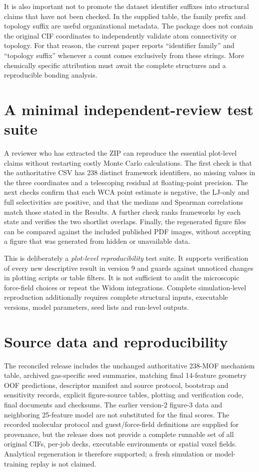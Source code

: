 \documentclass[11pt,a4paper]{article}
\begin{document}
It is also important not to promote the dataset identifier suffixes into structural claims that have not been checked. In the supplied table, the family prefix and topology suffix are useful organizational metadata. The package does not contain the original CIF coordinates to independently validate atom connectivity or topology. For that reason, the current paper reports ``identifier family'' and ``topology suffix'' whenever a count comes exclusively from these strings. More chemically specific attribution must await the complete structures and a reproducible bonding analysis.

\section{A minimal independent-review test suite}

A reviewer who has extracted the ZIP can reproduce the essential plot-level claims without restarting costly Monte Carlo calculations. The first check is that the authoritative CSV has 238 distinct framework identifiers, no missing values in the three coordinates and a telescoping residual at floating-point precision. The next checks confirm that each WCA point estimate is negative, the LJ-only and full selectivities are positive, and that the medians and Spearman correlations match those stated in the Results. A further check ranks frameworks by each state and verifies the two shortlist overlaps. Finally, the regenerated figure files can be compared against the included published PDF images, without accepting a figure that was generated from hidden or unavailable data.

This is deliberately a \emph{plot-level reproducibility} test suite. It supports verification of every new descriptive result in version 9 and guards against unnoticed changes in plotting scripts or table filters. It is not sufficient to audit the microscopic force-field choices or repeat the Widom integrations. Complete simulation-level reproduction additionally requires complete structural inputs, executable versions, model parameters, seed lists and run-level outputs.


\section{Source data and reproducibility}

The reconciled release includes the unchanged authoritative 238-MOF mechanism table, archived gas-specific seed summaries, matching final 14-feature geometry OOF predictions, descriptor manifest and source protocol, bootstrap and sensitivity records, explicit figure-source tables, plotting and verification code, final documents and checksums. The earlier version-2 figure-3 data and neighboring 25-feature model are not substituted for the final scores. The recorded molecular protocol and guest/force-field definitions are supplied for provenance, but the release does not provide a complete runnable set of all original CIFs, per-job decks, executable environments or spatial voxel fields. Analytical regeneration is therefore supported; a fresh simulation or model-training replay is not claimed.



\end{document}
